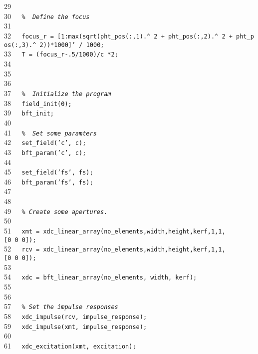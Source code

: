 \documentclass{manual}
\begin{document}
{29{\tt~~~}{\tt }\\
30{\tt~~~}{\tt {\sl \%~~Define~the~focus~}}\\
31{\tt~~~}{\tt }\\
32{\tt~~~}{\tt focus\_r~=~[1:max(sqrt(pht\_pos(:,1).\^~2~+~pht\_pos(:,2).\^~2~+~pht\_pos(:,3).\^~2))*1000]'~/~1000;}\\
33{\tt~~~}{\tt T~=~(focus\_r-.5/1000)/c~*2;}\\
34{\tt~~~}{\tt }\\
35{\tt~~~}{\tt }\\
36{\tt~~~}{\tt }\\
37{\tt~~~}{\tt {\sl \%~~Initialize~the~program}}\\
38{\tt~~~}{\tt field\_init(0);}\\
39{\tt~~~}{\tt bft\_init;}\\
40{\tt~~~}{\tt }\\
41{\tt~~~}{\tt {\sl \%~~Set~some~paramters}}\\
42{\tt~~~}{\tt set\_field('c',~c);}\\
43{\tt~~~}{\tt bft\_param('c',~c);}\\
44{\tt~~~}{\tt }\\
45{\tt~~~}{\tt set\_field('fs',~fs);}\\
46{\tt~~~}{\tt bft\_param('fs',~fs);}\\
47{\tt~~~}{\tt }\\
48{\tt~~~}{\tt }\\
49{\tt~~~}{\tt {\sl \%~Create~some~apertures.}}\\
50{\tt~~~}{\tt }\\
51{\tt~~~}{\tt xmt~=~xdc\_linear\_array(no\_elements,width,height,kerf,1,1,[0~0~0]);}\\
52{\tt~~~}{\tt rcv~=~xdc\_linear\_array(no\_elements,width,height,kerf,1,1,[0~0~0]);}\\
53{\tt~~~}{\tt }\\
54{\tt~~~}{\tt xdc~=~bft\_linear\_array(no\_elements,~width,~kerf);}\\
55{\tt~~~}{\tt }\\
56{\tt~~~}{\tt }\\
57{\tt~~~}{\tt {\sl \%~Set~the~impulse~responses}}\\
58{\tt~~~}{\tt xdc\_impulse(rcv,~impulse\_response);}\\
59{\tt~~~}{\tt xdc\_impulse(xmt,~impulse\_response);}\\
60{\tt~~~}{\tt }\\
61{\tt~~~}{\tt xdc\_excitation(xmt,~excitation);}\\
}
\end{document}
